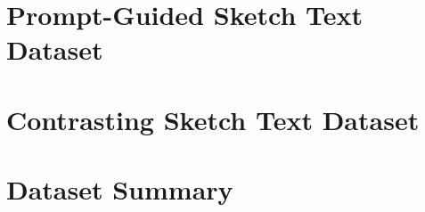 

\section{Prompt-Guided Sketch Text Dataset} \label{datav1}


\section{Contrasting Sketch Text Dataset} \label{datav2}


\section{Dataset Summary} \label{datasummary}
